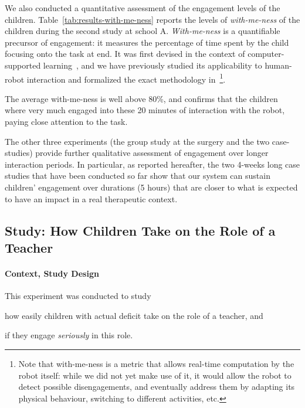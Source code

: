 \documentclass{article}
\begin{document}
We also conducted a quantitative assessment of the engagement levels of the
children. Table~\ref{tab:results-with-me-ness} reports the levels of
\emph{with-me-ness} of the children during the second study at school A.
\emph{With-me-ness} is a quantifiable precursor of engagement: it measures the
percentage of time spent by the child focusing onto the task at end. It was
first devised in the context of computer-supported
learning~\cite{sharma2014me}, and we have previously studied its applicability to
human-robot interaction and formalized the exact methodology
in~\cite{lemaignan2016realtime}\footnote{Note that with-me-ness is a metric that
allows real-time computation by the robot itself: while we did not yet make
use of it, it would allow the robot to detect possible disengagements, and
eventually address them by adapting its physical behaviour, switching to
different activities, etc.}.

The average with-me-ness is well above 80\%, and confirms that the children
where very much engaged into these 20 minutes of interaction with the robot,
paying close attention to the task.

The other three experiments (the group study at the surgery and the two
case-studies) provide further qualitative assessment of engagement over longer
interaction periods. In particular, as reported hereafter, the two 4-weeks long
case studies that have been conducted so far show that our system can sustain
children' engagement over durations (5 hours) that are closer to what is
expected to have an impact in a real therapeutic context.

\subsection{Study: How Children Take on the Role of a Teacher}\label{normandie}

\paragraph{Context, Study Design}

\begin{inparaenum}
This experiment was conducted to study \item how easily children with actual
deficit take on the role of a teacher, and \item if they engage \emph{seriously}
in this role.
\end{inparaenum}
\end{document}
